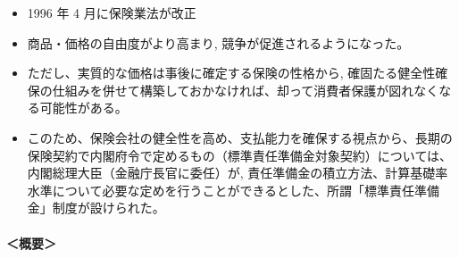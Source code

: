 \documentclass[report,gutter=10mm,fore-edge=10mm,uplatex,dvipdfmx]{jlreq}
\begin{document}
\begin{itemize}
\item
  1996 年 4 月に保険業法が改正
\item
  商品・価格の自由度がより高まり, 競争が促進されるようになった。
\item
  ただし、実質的な価格は事後に確定する保険の性格から,
  確固たる健全性確保の仕組みを併せて構築しておかなければ、却って消費者保護が図れなくなる可能性がある。
\item
  このため、保険会社の健全性を高め、支払能力を確保する視点から、長期の保険契約で内閣府令で定めるもの（標準責任準備金対象契約）については、
  内閣総理大臣（金融庁長官に委任）が,
  責任準備金の積立方法、計算基礎率水準について必要な定めを行うことができるとした、所謂「標準責任準備金」制度が設けられた。
\end{itemize}

\paragraph{＜概要＞}
\end{document}
